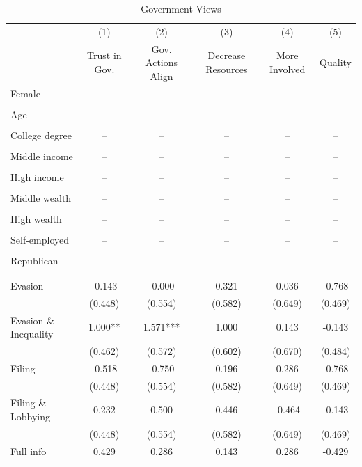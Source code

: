 \documentclass[11pt]{article}
\begin{document}
\FloatBarrier
\begin{table}[!htbp]\centering
\caption{Government Views}
\label{tab:government_views_noc}
\begin{threeparttable}
\footnotesize
\begin{tabular}{l|ccccc}
\toprule
& (1) & (2) & (3) & (4) & (5) \\
& Trust in Gov. & Gov. Actions Align & Decrease Resources & More Involved & Quality \\
\midrule
Female & -- & -- & -- & -- & -- \\
 &  &  &  &  &  \\
Age & -- & -- & -- & -- & -- \\
 &  &  &  &  &  \\
College degree & -- & -- & -- & -- & -- \\
 &  &  &  &  &  \\
Middle income & -- & -- & -- & -- & -- \\
 &  &  &  &  &  \\
High income & -- & -- & -- & -- & -- \\
 &  &  &  &  &  \\
Middle wealth & -- & -- & -- & -- & -- \\
 &  &  &  &  &  \\
High wealth & -- & -- & -- & -- & -- \\
 &  &  &  &  &  \\
Self-employed & -- & -- & -- & -- & -- \\
 &  &  &  &  &  \\
Republican & -- & -- & -- & -- & -- \\
 &  &  &  &  &  \\
\\[0.5em]
Evasion & -0.143 & -0.000 & 0.321 & 0.036 & -0.768 \\
 & (0.448) & (0.554) & (0.582) & (0.649) & (0.469) \\
Evasion \& Inequality & 1.000** & 1.571*** & 1.000 & 0.143 & -0.143 \\
 & (0.462) & (0.572) & (0.602) & (0.670) & (0.484) \\
Filing & -0.518 & -0.750 & 0.196 & 0.286 & -0.768 \\
 & (0.448) & (0.554) & (0.582) & (0.649) & (0.469) \\
Filing \& Lobbying & 0.232 & 0.500 & 0.446 & -0.464 & -0.143 \\
 & (0.448) & (0.554) & (0.582) & (0.649) & (0.469) \\
Full info & 0.429 & 0.286 & 0.143 & 0.286 & -0.429 \\

\end{tabular}
\end{threeparttable}
\end{table}
\end{document}

